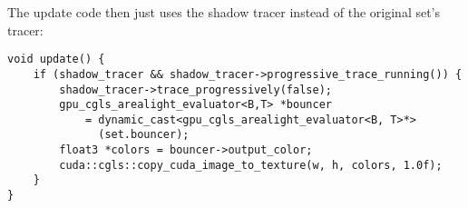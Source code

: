 \documentclass[a4paper,11pt]{scrartcl}
\begin{document}
The update code then just uses the shadow tracer instead of the original set's tracer:
\begin{lstlisting}
void update() {
	if (shadow_tracer && shadow_tracer->progressive_trace_running()) {
		shadow_tracer->trace_progressively(false);
		gpu_cgls_arealight_evaluator<B,T> *bouncer 
			= dynamic_cast<gpu_cgls_arealight_evaluator<B, T>*>
			  (set.bouncer);
		float3 *colors = bouncer->output_color;
		cuda::cgls::copy_cuda_image_to_texture(w, h, colors, 1.0f);
	}
}
\end{lstlisting}
\end{document}

